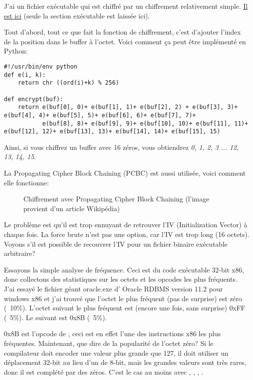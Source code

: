 
J'ai un fichier exécutable qui est chiffré par un chiffrement relativement simple.
\href{\RepoURL/examples/simple_exec_crypto/files/cipher.bin}{Il est ici}
(seule la section exécutable est laissée ici).

Tout d'abord, tout ce que fait la fonction de chiffrement, c'est d'ajouter l'index
de la position dans le buffer à l'octet.
Voici comment ça peut être implémenté en Python:

\begin{lstlisting}[caption=Python script,style=custompy]
#!/usr/bin/env python
def e(i, k):
    return chr ((ord(i)+k) % 256)

def encrypt(buf):
    return e(buf[0], 0)+ e(buf[1], 1)+ e(buf[2], 2) + e(buf[3], 3)+ e(buf[4], 4)+ e(buf[5], 5)+ e(buf[6], 6)+ e(buf[7], 7)+
           e(buf[8], 8)+ e(buf[9], 9)+ e(buf[10], 10)+ e(buf[11], 11)+ e(buf[12], 12)+ e(buf[13], 13)+ e(buf[14], 14)+ e(buf[15], 15)
\end{lstlisting}

Ainsi, si vous chiffrez un buffer avec 16 zéros, vous obtiendrez \emph{0, 1, 2, 3 ... 12, 13, 14, 15}.

La Propagating Cipher Block Chaining (PCBC) est aussi utilisée, voici comment elle
fonctionne:

\begin{figure}[H]
\centering
{}
\caption{Chiffrement avec Propagating Cipher Block Chaining (l'image provient d'un article Wikipédia)}
\end{figure}

Le problème est qu'il est trop ennuyant de retrouver l'IV (Initialization Vector)
à chaque fois.
La force brute n'est pas une option, car l'IV est trop long (16 octets).
Voyons s'il est possible de recouvrer l'IV pour un fichier binaire exécutable arbitraire?

Essayons la simple analyse de fréquence.
Ceci est du code exécutable 32-bit x86, donc collectons des statistiques sur les
octets et les opcodes les plus fréquents.
J'ai essayé le fichier géant oracle.exe d' Oracle RDBMS version 11.2 pour windows
x86 et j'ai trouvé que l'octet le plus fréquent (pas de surprise) est zéro (~10\%).
L'octet suivant le plus fréquent est (encore une fois, sans surprise) 0xFF (~5\%).
Le suivant est 0x8B (~5\%).

0x8B est l'opcode de , ceci est en effet l'une des instructions x86 les
plus fréquentes.
Maintenant, que dire de la popularité de l'octet zéro?
Si le compilateur doit encoder une valeur plus grande que 127, il doit utiliser un
déplacement 32-bit au lieu d'un de 8-bit, mais les grandes valeurs sont très rares,
donc il est complété par des zéros.
C'est le cas au moins avec , , , .

